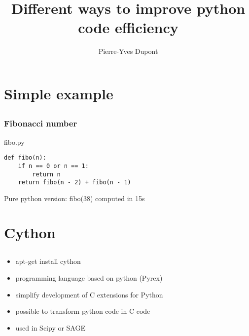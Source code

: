 \documentclass[12pt]{beamer}
\title[Python]{Different ways to improve python code efficiency}
\date{}
\institute{}
\author{Pierre-Yves Dupont}
\begin{document}
\begin{frame}
	\titlepage
\end{frame}

\section{Simple example}
\subsection*{}
\begin{frame}
  \begin{block}{}
  \end{block}
\end{frame}

\begin{frame}[fragile]
  \frametitle{Fibonacci number}
  \begin{block}{fibo.py}
	\begin{verbatim}
def fibo(n):
    if n == 0 or n == 1:
        return n
    return fibo(n - 2) + fibo(n - 1)
	\end{verbatim}
  \end{block} 
        Pure python version: fibo(38) computed in 15s
\end{frame}

\section{Cython}
\subsection*{}
\begin{frame}
  \begin{block}{}
  \end{block}
\end{frame}

\begin{frame}
  \begin{block}{}
    \begin{itemize}[<+->]
    \item apt-get install cython
    \item programming language based on python (Pyrex)
    \item simplify development of C extensions for Python
    \item possible to transform python code in C code
    \item used in Scipy or SAGE
    \end{itemize}
  \end{block}
\end{frame}
\end{document}
